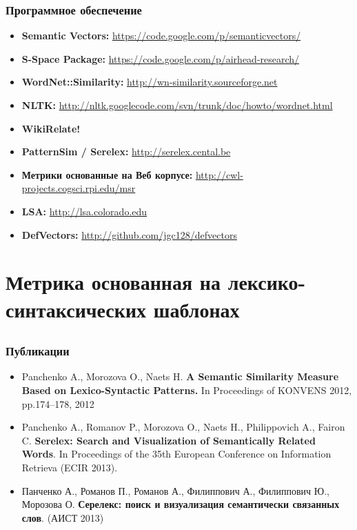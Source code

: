 \documentclass{beamer}
\begin{document}
\begin{frame}
\frametitle{Программное обеспечение}

\begin{itemize}
  \item \textbf{Semantic Vectors:} \url{https://code.google.com/p/semanticvectors/}
  \item \textbf{S-Space Package:} \url{https://code.google.com/p/airhead-research/}
  \item \textbf{WordNet::Similarity:} \url{http://wn-similarity.sourceforge.net}
  \item \textbf{NLTK:} \url{http://nltk.googlecode.com/svn/trunk/doc/howto/wordnet.html}
  \item \textbf{WikiRelate!}
  \item \textbf{PatternSim / Serelex:} \url{http://serelex.cental.be}
  \item \textbf{Метрики основанные на Веб корпусе:} \url{http://cwl-projects.cogsci.rpi.edu/msr}
  \item \textbf{LSA:} \url{http://lsa.colorado.edu}
  \item \textbf{DefVectors:} \url{http://github.com/jgc128/defvectors}
\end{itemize}

\end{frame}

   
\section[PatternSim]{Метрика основанная на лексико-синтаксических шаблонах}

\subsection{}

\begin{frame}
\frametitle{Публикации}

\begin{itemize}
\item Panchenko A., Morozova O., Naets H. \textbf{A Semantic Similarity Measure Based on Lexico-Syntactic Patterns.} In Proceedings of KONVENS 2012, pp.174--178, 2012
\item Panchenko A., Romanov P., Morozova O., Naets H., Philippovich A., Fairon
C. \textbf{Serelex: Search and Visualization of Semantically Related Words}.
In Proceedings of the 35th European Conference on Information Retrieva (ECIR 2013).

\item Панченко А., Романов П., Романов А.,  Филиппович А.,
Филиппович Ю., Морозова О. \textbf{Серелекс: поиск и визуализация
семантически связанных слов}. (АИСТ 2013)
\end{itemize}
\end{frame}
\end{document}

